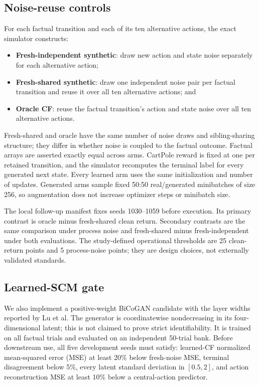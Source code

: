 \documentclass[runningheads]{llncs}
\begin{document}
\subsection{Noise-reuse controls}

For each factual transition and each of its ten alternative actions, the exact
simulator constructs:
\begin{itemize}
  \item \textbf{Fresh-independent synthetic}: draw new action and state noise
  separately for each alternative action;
  \item \textbf{Fresh-shared synthetic}: draw one independent noise pair per
  factual transition and reuse it over all ten alternative actions; and
  \item \textbf{Oracle CF}: reuse the factual transition's action and state
  noise over all ten alternative actions.
\end{itemize}
Fresh-shared and oracle have the same number of noise draws and sibling-sharing
structure; they differ in whether noise is coupled to the factual outcome.
Factual arrays are asserted exactly equal across arms. CartPole reward is fixed
at one per retained transition, and the simulator recomputes the terminal label
for every generated next state. Every learned arm uses the same initialization
and number of updates. Generated arms sample fixed
50:50 real/generated minibatches of size 256, so augmentation does not increase
optimizer steps or minibatch size.

The local follow-up manifest fixes seeds 1030--1059 before execution. Its primary
contrast is oracle minus fresh-shared clean return. Secondary contrasts are the
same comparison under process noise and fresh-shared minus fresh-independent
under both evaluations. The study-defined operational thresholds are 25
clean-return points and 5 process-noise points; they are design choices, not
externally validated standards.

\subsection{Learned-SCM gate}

We also implement a positive-weight BiCoGAN candidate with the layer widths
reported by Lu et al. The generator is coordinatewise nondecreasing in its
four-dimensional latent; this is not claimed to prove strict identifiability.
It is trained on all factual trials and evaluated on an independent 50-trial
bank. Before downstream use, all five development seeds must satisfy: learned-CF
normalized mean-squared error (MSE) at least 20\% below fresh-noise MSE, terminal disagreement below
5\%, every latent standard deviation in $[0.5,2]$, and action reconstruction
MSE at least 10\% below a central-action predictor.
\end{document}
